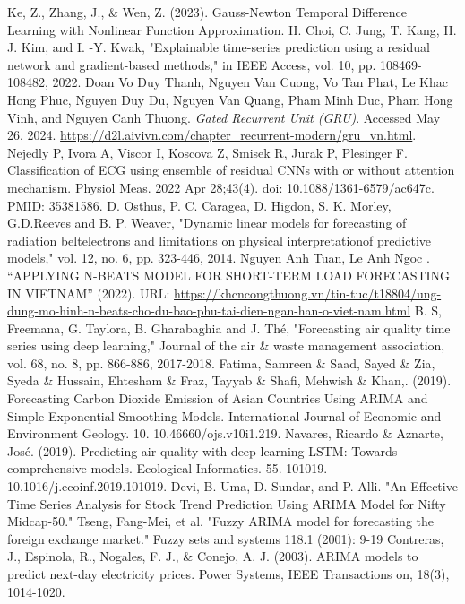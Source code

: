 \documentclass[conference]{IEEEtran}
\begin{document}
\begin{thebibliography}{00}
     Ke, Z., Zhang, J., \& Wen, Z. (2023). Gauss-Newton Temporal Difference Learning with Nonlinear Function Approximation.
     H. Choi, C. Jung, T. Kang, H. J. Kim, and I. -Y. Kwak, "Explainable time-series prediction using a residual network and gradient-based methods," in IEEE Access, vol. 10, pp. 108469-108482, 2022.
     Doan Vo Duy Thanh, Nguyen Van Cuong, Vo Tan Phat, Le Khac Hong Phuc, Nguyen Duy Du, Nguyen Van Quang, Pham Minh Duc, Pham Hong Vinh, and Nguyen Canh Thuong. \textit{Gated Recurrent Unit (GRU)}. Accessed May 26, 2024. \url{https://d2l.aivivn.com/chapter_recurrent-modern/gru_vn.html}.
     Nejedly P, Ivora A, Viscor I, Koscova Z, Smisek R, Jurak P, Plesinger F. Classification of ECG using ensemble of residual CNNs with or without attention mechanism. Physiol Meas. 2022 Apr 28;43(4). doi: 10.1088/1361-6579/ac647c. PMID: 35381586.
     D. Osthus, P. C. Caragea, D. Higdon, S. K. Morley, G.D.Reeves and B. P. Weaver, "Dynamic linear models for forecasting of radiation beltelectrons and limitations on physical interpretationof predictive models," vol. 12, no. 6, pp. 323-446, 2014.
     Nguyen Anh Tuan, Le Anh Ngoc . “APPLYING N-BEATS MODEL FOR SHORT-TERM LOAD FORECASTING IN VIETNAM” (2022). URL: \url{https://khcncongthuong.vn/tin-tuc/t18804/ung-dung-mo-hinh-n-beats-cho-du-bao-phu-tai-dien-ngan-han-o-viet-nam.html}
     B. S, Freemana, G. Taylora, B. Gharabaghia and J. Thé, "Forecasting air quality time series using deep learning," Journal of the air \& waste management association, vol. 68, no. 8, pp. 866-886, 2017-2018.
     Fatima, Samreen \& Saad, Sayed \& Zia, Syeda \& Hussain, Ehtesham \& Fraz, Tayyab \& Shafi, Mehwish \& Khan,. (2019). Forecasting Carbon Dioxide Emission of Asian Countries Using ARIMA and Simple Exponential Smoothing Models. International Journal of Economic and Environment Geology. 10. 10.46660/ojs.v10i1.219.
     Navares, Ricardo \& Aznarte, José. (2019). Predicting air quality with deep learning LSTM: Towards comprehensive models. Ecological Informatics. 55. 101019. 10.1016/j.ecoinf.2019.101019.
     Devi, B. Uma, D. Sundar, and P. Alli. "An Effective Time Series Analysis for Stock Trend Prediction Using ARIMA Model for Nifty Midcap-50."
     Tseng, Fang-Mei, et al. "Fuzzy ARIMA model for forecasting the foreign exchange market." Fuzzy sets and systems 118.1 (2001): 9-19
     Contreras, J., Espinola, R., Nogales, F. J., \& Conejo, A. J. (2003). ARIMA models to predict next-day electricity prices. Power Systems, IEEE Transactions on, 18(3), 1014-1020.

\end{thebibliography}
\end{document}
